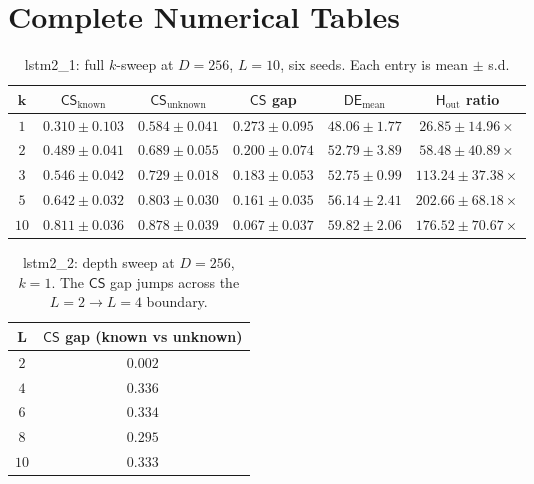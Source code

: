 \documentclass[11pt,a4paper]{article}
\newcommand{\CS}{\mathsf{CS}}
\newcommand{\DE}{\mathsf{DE}}
\newcommand{\Hout}{\mathsf{H}_{\mathrm{out}}}
\begin{document}
\newpage

\section{Complete Numerical Tables}
\label{app:tables}

\begin{table}[H]
\centering
\caption{lstm2\_1: full $k$-sweep at $D = 256$, $L = 10$, six seeds. Each entry is mean $\pm$ s.d.}
\label{tab:lstm2-1}
\renewcommand{\arraystretch}{1.25}
\vspace{4pt}
\begin{tabular}{c|ccccc}
\toprule
$\bm{k}$ & $\bm{\CS_{\mathrm{known}}}$ & $\bm{\CS_{\mathrm{unknown}}}$ &
$\bm{\CS}$\textbf{ gap} & $\bm{\DE_{\mathrm{mean}}}$ &
$\bm{\Hout}$\textbf{ ratio} \\
\midrule
$1$  & $0.310 \pm 0.103$ & $0.584 \pm 0.041$ & $0.273 \pm 0.095$ & $48.06 \pm 1.77$  & $26.85 \pm 14.96\times$ \\
$2$  & $0.489 \pm 0.041$ & $0.689 \pm 0.055$ & $0.200 \pm 0.074$ & $52.79 \pm 3.89$  & $58.48 \pm 40.89\times$ \\
$3$  & $0.546 \pm 0.042$ & $0.729 \pm 0.018$ & $0.183 \pm 0.053$ & $52.75 \pm 0.99$  & $113.24 \pm 37.38\times$ \\
$5$  & $0.642 \pm 0.032$ & $0.803 \pm 0.030$ & $0.161 \pm 0.035$ & $56.14 \pm 2.41$  & $202.66 \pm 68.18\times$ \\
$10$ & $0.811 \pm 0.036$ & $0.878 \pm 0.039$ & $0.067 \pm 0.037$ & $59.82 \pm 2.06$  & $176.52 \pm 70.67\times$ \\
\bottomrule
\end{tabular}
\end{table}

\begin{table}[H]
\centering
\caption{lstm2\_2: depth sweep at $D = 256$, $k = 1$. The $\CS$ gap jumps across the $L = 2 \to L = 4$ boundary.}
\label{tab:lstm2-2}
\renewcommand{\arraystretch}{1.25}
\vspace{4pt}
\begin{tabular}{c|c}
\toprule
$\bm{L}$ & $\bm{\CS}$\textbf{ gap (known vs unknown)} \\
\midrule
$2$  & $0.002$ \\
$4$  & $0.336$ \\
$6$  & $0.334$ \\
$8$  & $0.295$ \\
$10$ & $0.333$ \\
\bottomrule
\end{tabular}
\end{table}
\end{document}
